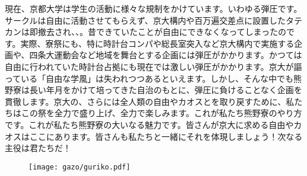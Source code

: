 現在、京都大学は学生の活動に様々な規制をかけています。いわゆる弾圧です。サークルは自由に活動させてもらえず、京大構内や百万遍交差点に設置したタテカンは即撤去され、、。昔できていたことが自由にできなくなってしまったのです。実際、寮祭にも、特に時計台コンパや総長室突入など京大構内で実施する企画や、四条大運動会など地域を舞台とする企画には弾圧がかかります。かつては自由に行われていた時計台占拠にも現在では激しい弾圧がかかります。京大が謳っている「自由な学風」は失われつつあるといえます。しかし、そんな中でも熊野寮は長い年月をかけて培ってきた自治のもとに、弾圧に負けることなく企画を貫徹します。京大の、さらには全人類の自由やカオスとを取り戻すために、私たちはこの祭を全力で盛り上げ、全力で楽しみます。これが私たち熊野寮のやり方です。これが私たち熊野寮の大いなる魅力です。皆さんが京大に求める自由やカオスはここにあります。皆さんも私たちと一緒にそれを体現しましょう！次なる主役は君たちだ！


\begin{figure}[H]
  \centering
  \texttt{[image: gazo/guriko.pdf]}%
  
\end{figure}

\subsecdefault



